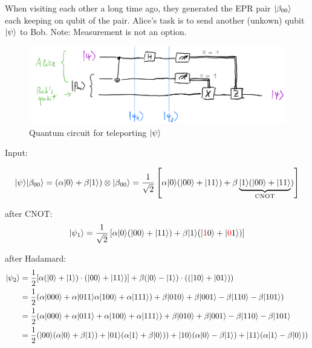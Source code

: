 When visiting each other a long time ago, they generated the EPR pair $\lvert\beta_{00}\rangle$ each keeping on qubit of the pair.
Alice's task is to send another (unkown) qubit $\lvert\psi\rangle$ to Bob.
Note: Measurement is not an option.

\begin{figure}[H]
    \centering
    \includegraphics[scale=0.42]{chapters/res/circuit-teleporting-psi.png}
    \caption{Quantum circuit for teleporting $\lvert\psi\rangle$}
\end{figure}

Input:

\begin{equation*}
    \lvert\psi\rangle \lvert\beta_{00}\rangle = (\alpha \lvert0\rangle + \beta \lvert1\rangle) \otimes \lvert\beta_{00}\rangle 
        = \frac{1}{\sqrt{2}} \left[\alpha \lvert0\rangle (\lvert00\rangle + \lvert11\rangle) + \beta \underbrace{\lvert1\rangle (\lvert00\rangle + \lvert11\rangle}_{\text{CNOT}})\right]
\end{equation*}

after CNOT:
\begin{equation*}
    \lvert\psi_1\rangle = \frac{1}{\sqrt{2}} 
        \left[\alpha \lvert0\rangle (\lvert00\rangle + \lvert11\rangle) + \beta \lvert1\rangle (\lvert{\color{red}1}0\rangle + \lvert{\color{red}0}1\rangle)\right]
\end{equation*}

after Hadamard:
\begin{align*}
    \lvert\psi_2\rangle &= \frac{1}{2} 
        [\alpha (\lvert0\rangle + \lvert1\rangle)  \cdot
            (\lvert00\rangle + \lvert11\rangle)]
        + \beta (\lvert0\rangle - \lvert1\rangle) \cdot 
            ((\lvert10\rangle + \lvert01\rangle)) \\
    &= \frac{1}{2} (\alpha \lvert000\rangle + \alpha \lvert011\rangle \alpha \lvert100\rangle + \alpha \lvert111\rangle)
        + \beta \lvert010\rangle + \beta \lvert001\rangle - \beta \lvert110\rangle - \beta \lvert101\rangle) \\
    &= \frac{1}{2} (\alpha \lvert000\rangle + \alpha \lvert011\rangle + \alpha \lvert100\rangle + \alpha \lvert111\rangle) + 
        \beta \lvert010\rangle + \beta \lvert001\rangle - \beta \lvert110\rangle - \beta \lvert101\rangle \\
    &= \frac{1}{2} (\lvert00\rangle (\alpha \lvert0\rangle + \beta \lvert1\rangle) + \lvert01\rangle (\alpha \lvert1\rangle + \beta \lvert0\rangle))
        + \lvert10\rangle (\alpha \lvert0\rangle - \beta \lvert1\rangle) + \lvert11\rangle (\alpha \lvert1\rangle - \beta \lvert0\rangle))
\end{align*}

